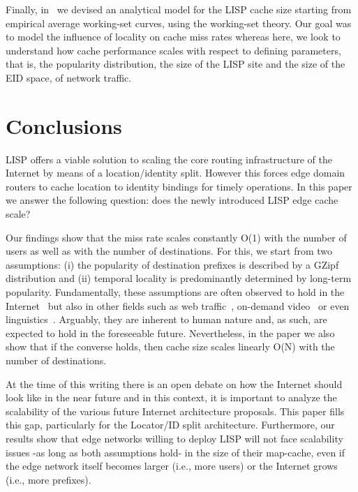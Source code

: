 \documentclass[twocolumn, 10pt]{article}
\theoremstyle{plain}
\begin{document}
Finally, in~\cite{coras:lcache_n} we devised an analytical model for the LISP
cache size starting from empirical average working-set curves, using the
working-set theory. Our goal was to model the influence of locality on cache
miss rates whereas here, we look to understand how cache performance scales with
respect to defining parameters, that is, the popularity distribution, the size
of the LISP site and the size of the EID space, of network traffic.


 
\section{Conclusions}\label{sec:conclusions}

LISP offers a viable solution to scaling the core routing infrastructure of
the Internet by means of a location/identity split. However this forces edge
domain routers to cache location to identity bindings for timely operations.
In this paper we answer the following question: does the newly introduced LISP
edge cache scale?

Our findings show that the miss rate scales constantly O(1) with the number of
users as well as with the number of destinations. For this, we start from two
assumptions: (i) the popularity of destination prefixes is described by a
GZipf distribution and (ii) temporal locality is predominantly determined by
long-term popularity. Fundamentally, these assumptions are often observed to
hold in the Internet~\cite{sarrar:leverage_zipf, kim:rcaching} but also in
other fields such as web traffic~\cite{breslau:web_and_zipf}, on-demand
video~\cite{cha:itube} or even linguistics~\cite{zipf:principle_least_effort}.
Arguably, they are inherent to human nature and, as such, are expected to hold
in the foreseeable future. Nevertheless, in the paper we also show that if the
converse holds, then cache size scales linearly O(N) with the number of
destinations.

At the time of this writing there is an open debate on how the Internet should
look like in the near future and in this context, it is important to analyze
the scalability of the various future Internet architecture proposals. This
paper fills this gap, particularly for the Locator/ID split architecture.
Furthermore, our results show that edge networks willing to deploy LISP will
not face scalability issues -as long as both assumptions hold- in the size of
their map-cache, even if the edge network itself becomes larger (i.e., more
users) or the Internet grows (i.e., more prefixes).
 
\end{document}
